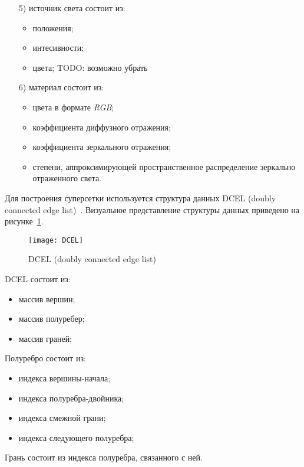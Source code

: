 \begin{enumerate}
    \item[5)] источник света состоит из:
    \begin{itemize}
        \item положения;
        \item интесивности;
        \item цвета; TODO: возможно убрать
    \end{itemize}

    \item[6)] материал состоит из:
    \begin{itemize}
        \item цвета в формате \textit{RGB};
        \item коэффициента диффузного отражения;
        \item коэффициента зеркального отражения;
        \item степени, аппроксимирующей пространственное распределение зеркально отраженного света.
    \end{itemize}
\end{enumerate}

Для построения суперсетки используется структура данных DCEL (doubly connected edge list)~\cite{alexa}. Визуальное представление структуры данных приведено на рисунке~\ref{fig:DCEL}.

\begin{figure}[H]
    \centering
    \texttt{[image: DCEL]}
    \label{fig:DCEL}
    \caption{DCEL (doubly connected edge list)~\cite{alexa}}
\end{figure}

DCEL состоит из:

\begin{itemize}
    \item массив вершин;
    \item массив полуребер;
    \item массив граней;
\end{itemize}

Полуребро состоит из:
\begin{itemize}
    \item индекса вершины-начала;
    \item индекса полуребра-двойника;
    \item индекса смежной грани;
    \item индекса следующего полуребра;
\end{itemize}

Грань состоит из индекса полуребра, связанного с ней.



